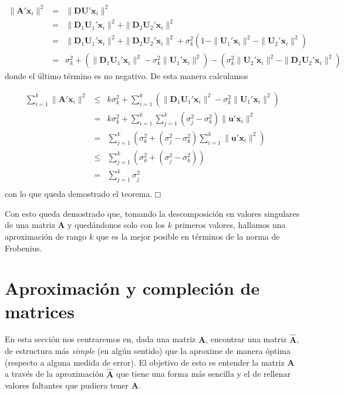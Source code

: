 \documentclass[tfg,cienciasbased,lot,lof,covers,final,overleaf,nocopyright]{tfgtfmthesisuam}
\begin{document}
\begin{eqnarray*}
    \| \mathbf{A'x}_i \|^2 & = & \| \mathbf{DU'x}_i \|^2 \\
    & = & \| \mathbf{D}_1\mathbf{U}_1'\mathbf{x}_i \|^2 + \| \mathbf{D}_2\mathbf{U}_2'\mathbf{x}_i \|^2 \\
    & = & \| \mathbf{D}_1\mathbf{U}_1'\mathbf{x}_i \|^2 + \| \mathbf{D}_2\mathbf{U}_2'\mathbf{x}_i \|^2 + \sigma_k^2 ( 1 -  \| \mathbf{U}_1'\mathbf{x}_i \|^2 -  \| \mathbf{U}_2'\mathbf{x}_i \|^2)\\
    & = & \sigma_k^2 +  (\| \mathbf{D}_1\mathbf{U}_1'\mathbf{x}_i \|^2 - \sigma_k^2 \| \mathbf{U}_1'\mathbf{x}_i \|^2) - ( \sigma_k^2 \| \mathbf{U}_2'\mathbf{x}_i \|^2 - \| \mathbf{D}_2\mathbf{U}_2'\mathbf{x}_i \|^2)
\end{eqnarray*}
donde el último término es no negativo. De esta manera calculamos

\begin{eqnarray*}
    \sum_{i=1}^k \| \mathbf{A'x}_i \|^2 & \leq & k\sigma_k^2 + \sum_{i=1}^k (\| \mathbf{D}_1\mathbf{U}_1'\mathbf{x}_i \|^2 - \sigma_k^2 \| \mathbf{U}_1'\mathbf{x}_i \|^2) \\
    & = & k\sigma_k^2 + \sum_{i=1}^k \sum_{j=1}^k (\sigma_j^2 - \sigma_k^2) \| \mathbf{u'x}_i \|^2 \\
    & = & \sum_{j=1}^k ( \sigma_k^2 + (\sigma_j^2 - \sigma_k^2) \sum_{i=1}^k \| \mathbf{u'x}_i \|^2 )\\
    & \leq & \sum_{j=1}^k ( \sigma_k^2 + (\sigma_j^2 - \sigma_k^2) )\\
    & = & \sum_{j=1}^k \sigma_j^2\\
\end{eqnarray*}
con lo que queda demostrado el teorema.\hfill$\Box$

Con esto queda demostrado que, tomando la descomposición en valores singulares de una matriz $\mathbf{A}$ y quedándonos solo con los $k$ primeros valores, hallamos una aproximación de rango $k$ que es la mejor posible en términos de la norma de Frobenius.

\section{Aproximación y compleción de matrices}
En esta sección nos centraremos en, dada una matriz $\mathbf{A}$, encontrar una matriz $\hat{\mathbf{A}}$, de estructura más \textit{simple} (en algún sentido) que la aproxime de manera óptima (respecto a alguna medida de error). El objetivo de esto es entender la matriz $\mathbf{A}$ a través de la aproximación $\hat{\mathbf{A}}$ que tiene una forma más sencilla y el de rellenar valores faltantes que pudiera tener $\mathbf{A}$. 
\end{document}

